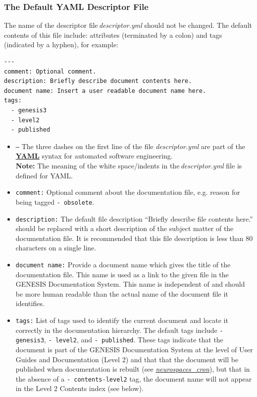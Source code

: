 \documentclass[12pt]{article}
\begin{document}
\subsubsection*{The Default YAML Descriptor File}

The name of the descriptor file\,{\it descriptor.yml} should not be changed. The default contents of this file include: attributes (terminated by a colon) and tags (indicated by a hyphen), for example:

\begin{verbatim}
---
comment: Optional comment.
description: Briefly describe document contents here. 
document name: Insert a user readable document name here.
tags:
  - genesis3
  - level2
  - published
\end{verbatim}

\begin{itemize}

\item[]{\tt ---} The three dashes on the first line of the file {\it descriptor.yml} are part of the \href{http://yaml.org}{\bf YAML} syntax for automated software engineering. \\
{\bf Note:} The meaning of the white space/indents in the\,{\it descriptor.yml} file is defined for YAML.

\item[]{\tt comment:} Optional comment about the documentation file, e.g. reason for being tagged {\tt -\,obsolete}.

\item[]{\tt description:} The default file description ``Briefly describe file contents here.'' should be replaced with a short description of the subject matter of the documentation file. It is recommended that this file description is less than 80 characters on a single line.

\item[]{\tt document\,name:} Provide a document name which gives the title of the documentation file. This name is used as a link to the given file in the GENESIS Documentation System. This name is independent of and should be more human readable than the actual name of the document file it identifies.

\item[]{\tt tags:} List of tags used to identify the current document and locate it correctly in the documentation hierarchy. The default tags include {\tt -\,genesis3}, {\tt -\,level2}, and {\tt -\,published}. These tags indicate that the document is part of the GENESIS Documentation System at the level of User Guides and Documentation (Level 2) and that that the document will be published when documentation is rebuilt (see \href{../neurospaces-cron/neurospaces-cron.tex}{\it neurospaces\_cron}), but that in the absence of a {\tt - contents-level2} tag, the document name will not appear in the Level 2 Contents index (see below).


\end{itemize}
\end{document}

